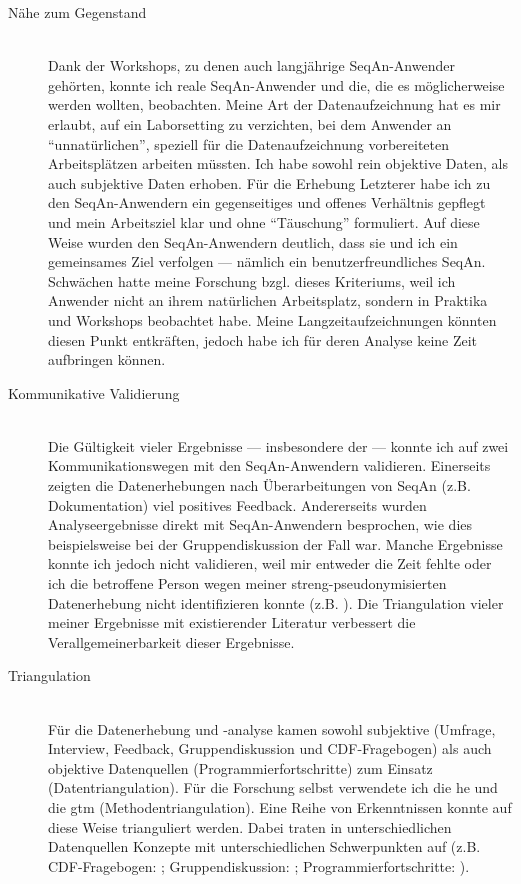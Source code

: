 \begin{description}
  \item[Nähe zum Gegenstand] \hfill \\
  Dank der Workshops, zu denen auch langjährige SeqAn-Anwender gehörten, konnte ich reale SeqAn-Anwender und die, die es möglicherweise werden wollten, beobachten. Meine Art der Datenaufzeichnung hat es mir erlaubt, auf ein Laborsetting zu verzichten, bei dem Anwender an ``unnatürlichen'', speziell für die Datenaufzeichnung vorbereiteten Arbeitsplätzen arbeiten müssten. Ich habe sowohl rein objektive Daten, als auch subjektive Daten erhoben. Für die Erhebung Letzterer habe ich zu den SeqAn-Anwendern ein gegenseitiges und offenes Verhältnis gepflegt und mein Arbeitsziel klar und ohne ``Täuschung'' formuliert. Auf diese Weise wurden den SeqAn-Anwendern deutlich, dass sie und ich ein gemeinsames Ziel verfolgen --- nämlich ein benutzerfreundliches SeqAn.
  Schwächen hatte meine Forschung bzgl. dieses Kriteriums, weil ich Anwender nicht an ihrem natürlichen Arbeitsplatz, sondern in Praktika und Workshops beobachtet habe. Meine Langzeitaufzeichnungen könnten diesen Punkt entkräften, jedoch habe ich für deren Analyse keine Zeit aufbringen können. 
  
  \item[Kommunikative Validierung] \hfill \\
  Die Gültigkeit vieler Ergebnisse --- insbesondere der  --- konnte ich auf zwei Kommunikationswegen mit den SeqAn-Anwendern validieren. Einerseits zeigten die Datenerhebungen nach Überarbeitungen von SeqAn (z.B. Dokumentation) viel positives Feedback. Andererseits wurden Analyseergebnisse direkt mit SeqAn-Anwendern besprochen, wie dies beispielsweise bei der Gruppendiskussion der Fall war. Manche Ergebnisse konnte ich jedoch nicht validieren, weil mir entweder die Zeit fehlte oder ich die betroffene Person wegen meiner streng-pseudonymisierten Datenerhebung nicht identifizieren konnte (z.B. ). Die Triangulation vieler meiner Ergebnisse mit existierender Literatur verbessert die Verallgemeinerbarkeit dieser Ergebnisse.
  
  \item[Triangulation] \hfill \\
  Für die Datenerhebung und -analyse kamen sowohl subjektive (Umfrage, Interview, Feedback, Gruppendiskussion und CDF-Fragebogen) als auch objektive Datenquellen (Programmierfortschritte) zum Einsatz (Datentriangulation). Für die Forschung selbst verwendete ich die \acrshort{he} und die \gls{gtm} (Methodentriangulation). Eine Reihe von Erkenntnissen konnte auf diese Weise trianguliert werden. Dabei traten in unterschiedlichen Datenquellen Konzepte mit unterschiedlichen Schwerpunkten auf (z.B. CDF-Fragebogen: ; Gruppendiskussion: ; Programmierfortschritte: ).
  

\end{description}
